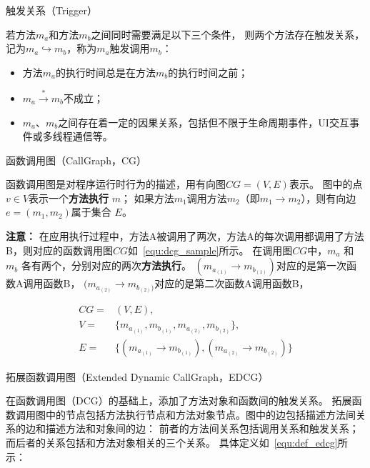 \begin{myDef}
	触发关系（Trigger）
\end{myDef}
	
	若方法$m_a$和方法$m_b$之间同时需要满足以下三个条件，
	则两个方法存在触发关系，记为$m_a \hookrightarrow m_b$，称为$m_a$触发调用$m_b$：
	
	\begin{itemize}
		\item 方法$m_a$的执行时间总是在方法$m_b$的执行时间之前；
		\item $m_a \stackrel{\ast}{\to} m_b $不成立；
		\item $m_a$、$m_b$之间存在着一定的因果关系，包括但不限于生命周期事件，UI交互事件或多线程通信等。
	\end{itemize}


\begin{myDef}
	函数调用图（CallGraph，CG）
\end{myDef}	
	函数调用图是对程序运行时行为的描述，用有向图$CG = ( V , E)$表示。 图中的点$ v \in V $表示一个\textbf{方法执行} $m$；
	如果方法$m_1$调用方法$m_2$（即$m_1 \to m_2$），则有向边 $e = (m_1 ,m_2)$属于集合 $E$。 


\textbf{注意：}
在应用执行过程中，方法A被调用了两次，方法A的每次调用都调用了方法B，则对应的函数调用图$CG$如~\autoref{equ:dcg_sample}所示。
在调用图$CG$中，$m_a$ 和 $m_b$ 各有两个，分别对应的两次\textbf{方法执行}。
$(m_{a_{(1)}} \to m_{b_{(1)}})$对应的是第一次函数A调用函数B，
$(m_{a_{(2)}} \to m_{b_{(2)})}$对应的是第二次函数A调用函数B，

\begin{equation}
\begin{aligned}
CG = &(V,E) ,\\ 
V = & \{m_{a_{(1)}},m_{b_{(1)}},m_{a_{(2)}},m_{b_{(2)}}\}, \\ 
E = & \{  
(  m_{a_{(1)}} \to m_{b_{(1)}}) ,( m_{a_{(2)}} \to m_{b_{(2)}})
\} 
\end{aligned}
\label{equ:dcg_sample} 
\end{equation}



\begin{myDef}
	拓展函数调用图（Extended Dynamic CallGraph，EDCG）
\end{myDef}
	在函数调用图（DCG）的基础上，添加了方法对象和函数间的触发关系。
	拓展函数调用图中的节点包括方法执行节点和方法对象节点。图中的边包括描述方法间关系的边和描述方法和对象间的边：
	前者的方法间关系包括调用关系和触发关系；而后者的关系包括和方法对象相关的三个关系。
	具体定义如~\autoref{equ:def_edcg}所示：
	
